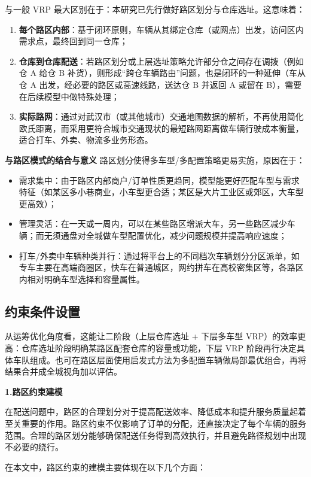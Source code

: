 \documentclass[12pt,a4paper,twoside]{ctexbook}
\begin{document}
与一般 VRP 最大区别在于：本研究已先行做好路区划分与仓库选址。这意味着：
\begin{enumerate}
    \item \textbf{每个路区内部}：基于闭环原则，车辆从其绑定仓库（或网点）出发，访问区内需求点，最终回到同一仓库；
    \item \textbf{仓库到仓库配送}：若路区划分或上层选址策略允许部分仓之间存在调拨（例如仓 A 给仓 B 补货），则形成“跨仓车辆路由”问题，也是闭环的一种延伸（车从仓 A 出发，经必要的路区或高速线路，送达仓 B 并返回 A 或留在 B），需要在后续模型中做特殊处理；
    \item \textbf{实际路网}：通过对武汉市（或其他城市）交通地图数据的解析，不再使用简化欧氏距离，而采用更符合城市交通现状的最短路网距离做车辆行驶成本衡量，适合打车、外卖、物流多业务形态。
\end{enumerate}

\textbf{与路区模式的结合与意义}
路区划分使得多车型/多配置策略更易实施，原因在于：
\begin{itemize}
    \item 需求集中：由于路区内部商户/订单性质更趋同，模型能更好匹配车型与需求特征（如某区多小巷商业，小车型更合适；某区是大片工业区或郊区，大车型更高效）；
    \item 管理灵活：在一天或一周内，可以在某些路区增派大车，另一些路区减少车辆；而无须通盘对全城做车型配置优化，减少问题规模并提高响应速度；
    \item 打车/外卖中车辆种类并行：通过将平台上的不同档次车辆划分分区派单，如专车主要在高端商圈区，快车在普通城区，网约拼车在高校密集区等，各路区内相对明确车型选择和容量属性。
\end{itemize}

\subsection{约束条件设置}

从运筹优化角度看，这能让二阶段（上层仓库选址 + 下层多车型 VRP）的效率更高：仓库选址阶段明确某路区配套仓库的容量或功能，下层 VRP 阶段再行决定具体车队组成。也可在路区层面使用启发式方法为多配置车辆做局部最优组合，再将结果合并成全城视角加以评估。

\textbf{1.路区约束建模}

在配送问题中，路区的合理划分对于提高配送效率、降低成本和提升服务质量起着至关重要的作用。路区约束不仅影响了订单的分配，还直接决定了每个车辆的服务范围。合理的路区划分能够确保配送任务得到高效执行，并且避免路径规划中出现不必要的绕行。

在本文中，路区约束的建模主要体现在以下几个方面：
\end{document}
